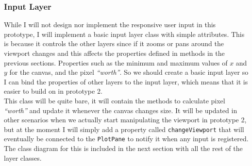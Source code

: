 \documentclass[../../../../../../main.tex]{subfiles}
\begin{document}
\subsubsection{Input Layer}
While I will not design nor implement the responsive user input in this prototype, I will implement a basic input layer class with simple attributes.  This is because it controls the other layers since if it zooms or pans around the viewport changes and this affects the properties defined in methods in the previous sections. Properties such as the minimum and maximum values of $x$ and $y$ for the canvas, and the pixel \textit{``worth''}. So we should create a basic input layer so I can bind the properties of other layers to the input layer, which means that it is easier to build on in prototype 2.\\
This class will be quite bare, it will contain the methods to calculate pixel \textit{``worth''} and update it whenever the canvas changes size. It will be updated in other scenarios when we actually start manipulating the viewport in prototype 2, but at the moment I will simply add a property called \texttt{changeViewport} that will eventually be connected to the \texttt{PlotPane} to notify it when any input is registered. The class diagram for this is included in the next section with all the rest of the layer classes.
\newpage
\end{document}
